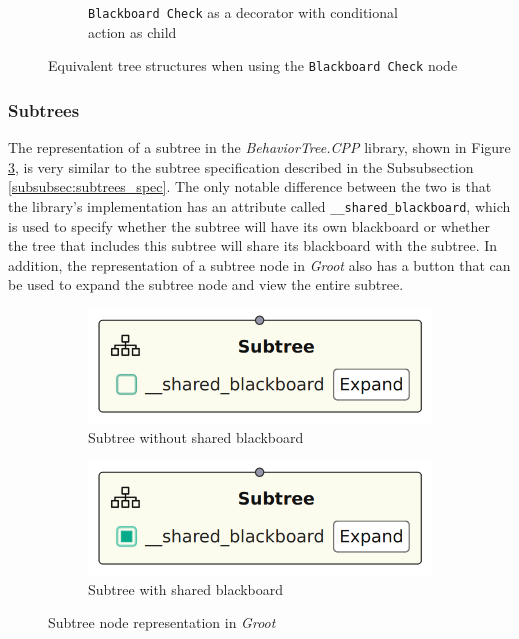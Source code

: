 \begin{figure}[!h]
\begin{subfigure}[b]{.49\linewidth}
        \caption{\texttt{Blackboard Check} as a decorator with conditional action as child}
        \label{fig:blackboard_check_eq_action_as_child}
    \end{subfigure}
    \caption{Equivalent tree structures when using the \texttt{Blackboard Check} node}
    \label{fig:blackboard_check_equivalences}
\end{figure}

\subsubsection{Subtrees}

The representation of a subtree in the \textit{BehaviorTree.CPP} library, shown in Figure \ref{fig:subtrees_impl}, is very similar to the subtree specification described in the Subsubsection \ref{subsubsec:subtrees_spec}. The only notable difference between the two is that the library's implementation has an attribute called \texttt{\_\_shared\_blackboard}, which is used to specify whether the subtree will have its own blackboard or whether the tree that includes this subtree will share its blackboard with the subtree. In addition, the representation of a subtree node in \textit{Groot} also has a button that can be used to expand the subtree node and view the entire subtree.

\begin{figure}[!h]
    \centering
    \begin{subfigure}[b]{.49\linewidth}
        \centering
        \includegraphics[width=0.6\linewidth]{chapters/development/images/SubtreeNode - Not Shared BB.png}
        \caption{Subtree without shared blackboard}
    \end{subfigure}
    \hfill
    \begin{subfigure}[b]{.49\linewidth}
        \centering
        \includegraphics[width=0.6\linewidth]{chapters/development/images/SubtreeNode - Shared BB.png}
        \caption{Subtree with shared blackboard}
    \end{subfigure}
    \caption{Subtree node representation in \textit{Groot}}
    \label{fig:subtrees_impl}
\end{figure}

